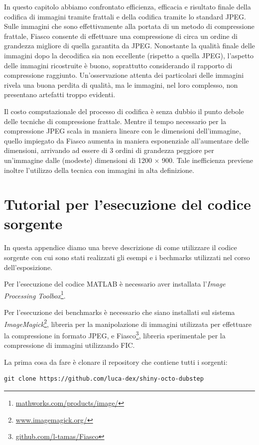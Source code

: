 \documentclass[11pt,a4paper,appendixprefix=true,numbers=noenddot]{scrreprt}
\begin{document}
In questo capitolo abbiamo confrontato efficienza, efficacia e risultato finale della codifica di immagini tramite frattali e della codifica tramite lo standard JPEG. Sulle immagini che sono effettivamente alla portata di un metodo di compressione frattale, Fiasco consente di effettuare una compressione di circa un ordine di grandezza migliore di quella garantita da JPEG. Nonostante la qualità finale delle immagini dopo la decodifica sia non eccellente (rispetto a quella JPEG), l'aspetto delle immagini ricostruite è buono, soprattutto considerando il rapporto di compressione raggiunto. Un'osservazione attenta dei particolari delle immagini rivela una buona perdita di qualità, ma le immagini, nel loro complesso, non presentano artefatti troppo evidenti.

Il costo computazionale del processo di codifica è senza dubbio il punto debole delle tecniche di compressione frattale. Mentre il tempo necessario per la compressione JPEG scala in maniera lineare con le dimensioni dell'immagine, quello impiegato da Fiasco aumenta in maniera esponenziale all'aumentare delle dimensioni, arrivando ad essere di 3 ordini di grandezza peggiore per un'immagine dalle (modeste) dimensioni di 1200 $\times$ 900. Tale inefficienza previene inoltre l'utilizzo della tecnica con immagini in alta definizione.

\appendix

\chapter{Tutorial per l'esecuzione del codice sorgente}

In questa appendice diamo una breve descrizione di come utilizzare il codice sorgente con cui sono stati realizzati gli esempi e i bechmarks utilizzati nel corso dell'esposizione. 

Per l'esecuzione del codice MATLAB è necessario aver installata l'\emph{Image Processing Toolbox}\footnote{\url{mathworks.com/products/image/}}.

Per l'esecuzione dei benchmarks è necessario che siano installati sul sistema \emph{ImageMagick}\footnote{\url{www.imagemagick.org/}}, libreria per la manipolazione di immagini utilizzata per effettuare la compressione in formato JPEG, e Fiasco\footnote{\url{github.com/l-tamas/Fiasco}}, libreria sperimentale per la compressione di immagini utilizzando FIC.

\noindent La prima cosa da fare è clonare il repository che contiene tutti i sorgenti:
\begin{verbatim}
git clone https://github.com/luca-dex/shiny-octo-dubstep
\end{verbatim}
\end{document}
